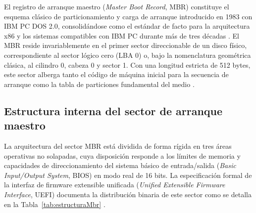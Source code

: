 \documentclass[12pt]{article}
\begin{document}
El registro de arranque maestro (\textit{Master Boot Record}, MBR) constituye el esquema clásico de particionamiento y carga de arranque introducido en 1983 con IBM PC DOS 2.0, consolidándose como el estándar de facto para la arquitectura x86 y los sistemas compatibles con IBM PC durante más de tres décadas \parencite[\S 12.5.2, p.\ 419]{silberschatz2006fundamentos}. El MBR reside invariablemente en el primer sector direccionable de un disco físico, correspondiente al sector lógico cero (LBA 0) o, bajo la nomenclatura geométrica clásica, al cilindro 0, cabeza 0 y sector 1. Con una longitud estricta de 512 bytes, este sector alberga tanto el código de máquina inicial para la secuencia de arranque como la tabla de particiones fundamental del medio \parencite[\S 5.2.1, p.\ 110]{uefi2024specification}.

\subsection{Estructura interna del sector de arranque maestro}
\label{subsec:estructuraInternaMbr}

La arquitectura del sector MBR está dividida de forma rígida en tres áreas operativas no solapadas, cuya disposición responde a los límites de memoria y capacidades de direccionamiento del sistema básico de entrada/salida (\textit{Basic Input/Output System}, BIOS) en modo real de 16 bits. La especificación formal de la interfaz de firmware extensible unificada (\textit{Unified Extensible Firmware Interface}, UEFI) documenta la distribución binaria de este sector como se detalla en la Tabla~\ref{tab:estructuraMbr} \parencite[\S 5.2.1, p.\ 110]{uefi2024specification}.
\end{document}
